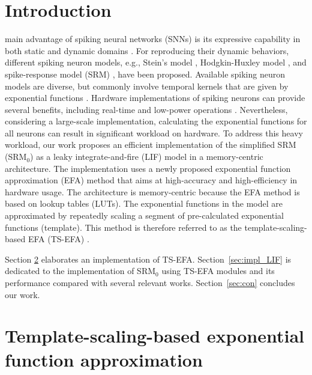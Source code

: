 \documentclass[10pt,journal]{IEEEtran}
\begin{document}
\section{Introduction}
 main advantage of spiking neural networks (SNNs) is its expressive capability in both static and dynamic domains \cite{jeong2018tutorial,pfeiffer2018deep, tavanaei2019deep,roy2019towards}. 
For reproducing their dynamic behaviors, different spiking neuron models, e.g., Stein’s model \cite{stein1965theoretical}, Hodgkin-Huxley model \cite{izhikevich2003simple}, and spike-response model (SRM) \cite{gerstner2002spiking}, have been proposed. 
Available spiking neuron models are diverse, but commonly involve temporal kernels that are given by exponential functions \cite{gerstner2002spiking,dayan2001theoretical}.
Hardware implementations of spiking neurons can provide several benefits, including real-time and low-power operations \cite{indiveri2011neuromorphic}.
Nevertheless, considering a large-scale implementation, calculating the exponential functions for all neurons can result in significant workload on hardware. 
To address this heavy workload, our work proposes an efficient implementation of the simplified SRM (SRM$_\textrm{0}$) as a leaky integrate-and-fire (LIF) model in a memory-centric architecture. The implementation uses a newly proposed exponential function approximation (EFA) method that aims at high-accuracy and high-efficiency in hardware usage. The architecture is memory-centric because the EFA method is based on lookup tables (LUTs). The exponential functions in the model are approximated by repeatedly scaling a segment of pre-calculated exponential functions (template). 
This method is therefore referred to as the template-scaling-based EFA (TS-EFA) \cite{kim2020isqed}.

Section \ref{sec:tsefa} elaborates an implementation of TS-EFA. 
Section~\ref{sec:impl_LIF} is dedicated to the implementation of SRM$_\textrm{0}$ using TS-EFA modules and its performance compared with several relevant works.
Section~\ref{sec:con} concludes our work.


\section{Template-scaling-based exponential function approximation}
\label{sec:tsefa}
\end{document}
